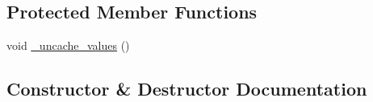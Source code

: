\subsection*{Protected Member Functions}
\begin{DoxyCompactItemize}
\item 
void \hyperlink{classIceBRG_1_1pair__bin_af6ee5173022f9fa8b4528b7d6e18b0d2}{\+\_\+uncache\+\_\+values} ()
\end{DoxyCompactItemize}


\subsection{Constructor \& Destructor Documentation}
\hypertarget{classIceBRG_1_1pair__bin_ab951efb7c961a3910cd30e4eab58fbbf}{}
